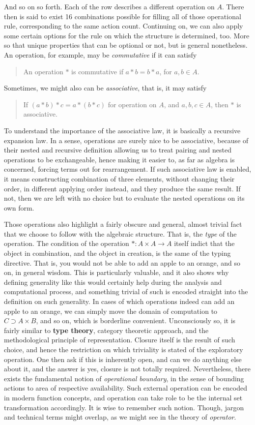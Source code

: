 And so on so forth. Each of the row describes a different operation on $A$. There then is said to exist 16 combinations possible for filling all of those operational rule, corresponding to the same action count. Continuing on, we can also apply some certain options for the rule on which the structure is determined, too. More so that unique properties that can be optional or not, but is general nonetheless. An operation, for example, may be \textit{commutative} if it can satisfy 
\begin{quote}
    An operation $*$ is commutative if $a*b=b*a$, for $a,b\in A$. 
\end{quote}
Sometimes, we might also can be \textit{associative}, that is, it may satisfy
\begin{quote}
    If $(a*b)*c = a*(b*c)$ for operation on $A$, and $a,b,c\in A$, then $*$ is associative. 
\end{quote}
To understand the importance of the associative law, it is basically a recursive expansion law. In a sense, operations are surely nice to be associative, because of their nested and recursive definition allowing us to treat pairing and nested operations to be exchangeable, hence making it easier to, as far as algebra is concerned, forcing terms out for rearrangement. If such associative law is enabled, it means constructing combination of three elements, without changing their order, in different applying order instead, and they produce the same result. If not, then we are left with no choice but to evaluate the nested operations on its own form. 

Those operations also highlight a fairly obscure and general, almost trivial fact that we choose to follow with the algebraic structure. That is, the \textit{type} of the operation. The condition of the operation $*: A\times A \to A$ itself indict that the object in combination, and the object in creation, is the same of the typing directive. That is, you would not be able to add an apple to an orange, and so on, in general wisdom. This is particularly valuable, and it also shows why defining generality like this would certainly help during the analysis and computational process, and something trivial of such is encoded straight into the definition on such generality. In cases of which operations indeed can add an apple to an orange, we can simply move the domain of computation to $C\supset A\times B$, and so on, which is borderline convenient. Unconsciously so, it is fairly similar to \textbf{type theory}, category theoretic approach, and the methodological principle of representation. Closure itself is the result of such choice, and hence the restriction on which triviality is stated of the exploratory operation. One then ask if this is inherently open, and can we do anything else about it, and the answer is yes, closure is not totally required. Nevertheless, there exists the fundamental notion of \textit{operational boundary}, in the sense of bounding actions to area of respective availability. Such external operation can be encoded in modern function concepts, and operation can take role to be the internal set transformation accordingly. It is wise to remember such notion. Though, jargon and technical terms might overlap, as we might see in the theory of \textit{operator}. 

